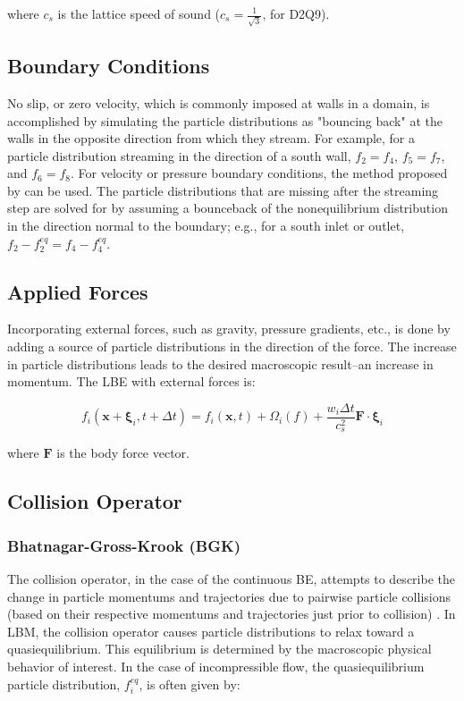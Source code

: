 \documentclass[pdftex,ms]{pittetd}
\newcommand{\pos}{\mathbf{x}}
\newcommand{\pvel}{\boldsymbol{\xi}}
\begin{document}
\noindent where $c_s$ is the lattice speed of sound ($c_s = \frac{1}{\sqrt{3}}$, for D2Q9).

\subsection{Boundary Conditions}

No slip, or zero velocity, which is commonly imposed at walls in a domain, is accomplished by simulating the particle distributions as "bouncing back" at the walls in the opposite direction from which they stream.
For example, for a particle distribution streaming in the direction of a south wall, $f_2 = f_4$, $f_5 = f_7$, and $f_6 = f_8$.
For velocity or pressure boundary conditions, the method proposed by \citet{zou1997pressure} can be used.
The particle distributions that are missing after the streaming step are solved for by assuming a bounceback of the nonequilibrium distribution in the direction normal to the boundary; e.g., for a south inlet or outlet, $f_2 - f_2^{eq} = f_4 - f_4^{eq}$.

\subsection{Applied Forces}

Incorporating external forces, such as gravity, pressure gradients, etc., is done by adding a source of particle distributions in the direction of the force.
The increase in particle distributions leads to the desired macroscopic result--an increase in momentum.
The LBE with external forces is:

\begin{equation}
f_i(\pos + \pvel_i, t + \Delta t) = f_i(\pos, t) + \Omega_i(f) + \frac{w_i \Delta t}{c_s^2} \mathbf{F} \cdot \pvel_i
\end{equation}

\noindent where $\mathbf{F}$ is the body force vector.

\subsection{Collision Operator}

\subsubsection{Bhatnagar-Gross-Krook (BGK)} \label{sec:bgk}

The collision operator, in the case of the continuous BE, attempts to describe the change in particle momentums and trajectories due to pairwise particle collisions (based on their respective momentums and trajectories just prior to collision) \cite{Cer90}.
In LBM, the collision operator causes particle distributions to relax toward a quasiequilibrium. %
This equilibrium is determined by the macroscopic physical behavior of interest.
In the case of incompressible flow, the quasiequilibrium particle distribution, $f_i^{eq}$, is often given by:
\end{document}
